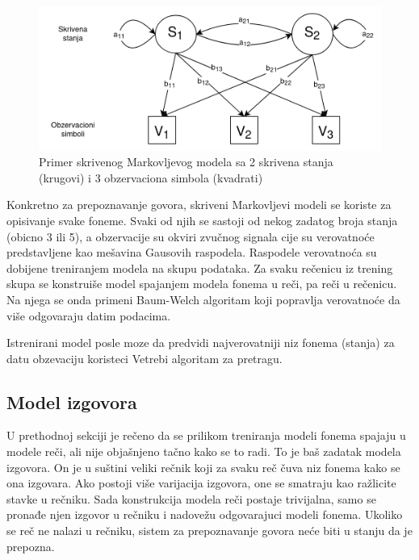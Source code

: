 \documentclass[a4paper]{article}
\begin{document}
\begin{figure}[h!]
  \begin{center}
    \includegraphics[scale=0.3]{hmm.png}
  \end{center}
  \caption{Primer skrivenog Markovljevog modela sa 2 skrivena stanja (krugovi) i 3 obzervaciona simbola (kvadrati)}
  \label{fig:hmm}
\end{figure}

Konkretno za prepoznavanje govora, skriveni Markovljevi modeli se koriste za opisivanje svake foneme.
Svaki od njih se sastoji od nekog zadatog broja stanja (obicno 3 ili 5), a obzervacije su okviri zvučnog signala cije su verovatnoće predstavljene kao mešavina Gausovih raspodela.
Raspodele verovatnoća su dobijene treniranjem modela na skupu podataka.
Za svaku rečenicu iz trening skupa se konstruiše model spajanjem modela fonema u reči, pa reči u rečenicu.
Na njega se onda primeni Baum-Welch algoritam koji popravlja verovatnoće da više odgovaraju datim podacima.

Istrenirani model posle moze da predvidi najverovatniji niz fonema (stanja) za datu obzevaciju koristeci Vetrebi algoritam za pretragu.

\subsection{Model izgovora}
U prethodnoj sekciji je rečeno da se prilikom treniranja modeli fonema spajaju u modele reči, ali nije objašnjeno tačno kako se to radi.
To je baš zadatak modela izgovora.
On je u suštini veliki rečnik koji za svaku reč čuva niz fonema kako se ona izgovara.
Ako postoji više varijacija izgovora, one se smatraju kao ražlicite stavke u rečniku.
Sada konstrukcija modela reči postaje trivijalna, samo se pronađe njen izgovor u rečniku i nadovežu odgovarajuci modeli fonema.
Ukoliko se reč ne nalazi u rečniku, sistem za prepoznavanje govora neće biti u stanju da je prepozna.
\end{document}

